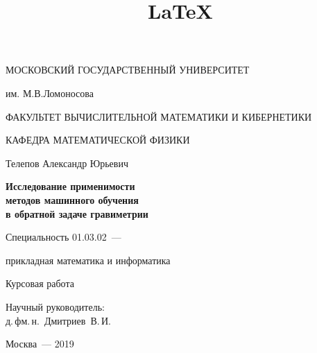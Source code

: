 \documentclass[12pt]{article}
\title{\LaTeX}
\date{}
\author{}
\begin{document}
\centerline{МОСКОВСКИЙ ГОСУДАРСТВЕННЫЙ УНИВЕРСИТЕТ}
\centerline{им. М.В.Ломоносова}
\centerline{ФАКУЛЬТЕТ ВЫЧИСЛИТЕЛЬНОЙ МАТЕМАТИКИ И КИБЕРНЕТИКИ}
\vfill
\centerline{КАФЕДРА МАТЕМАТИЧЕСКОЙ ФИЗИКИ}
\vfill
\vfill
\vfill
\large
\centerline{{Телепов} Александр Юрьевич}
\vfill
\Large
\begin{centering}
{\bf Исследование применимости\\ методов машинного обучения \\
в обратной задаче гравиметрии\\}
\end{centering}
\normalsize
\vfill
\centerline{Специальность 01.03.02~--- }
\centerline{прикладная математика и информатика}
\vfill
\centerline{Курсовая работа}
\vfill
\vfill
\begin{flushright}
Научный руководитель:\\
д.\,фм.\,н.~Дмитриев~В.\,И.
\end{flushright}
\vfill
\vfill
\centerline{Москва~--- 2019}
\clearpage

\end{document}
